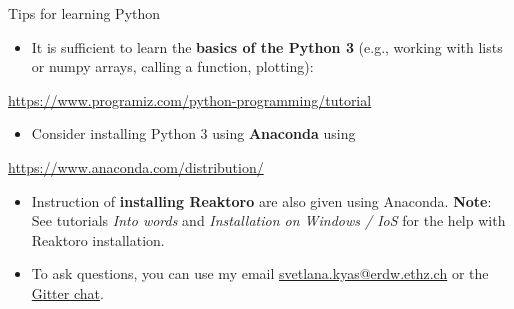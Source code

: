 \begin{frame}{Tips for learning Python}
\begin{itemize}
\item It is sufficient to learn the \alert{\textbf{basics of the Python 3}} (e.g., working with lists or numpy arrays, 
calling a function, plotting):
\end{itemize}
\begin{center}
{\href{https://www.programiz.com/python-programming/tutorial}{https://www.programiz.com/python-programming/tutorial}}{\large\par}
\par\end{center}
\begin{itemize}
\item Consider installing Python 3 using \alert{\textbf{Anaconda}} using
\end{itemize}
\begin{center}
{\href{https://www.anaconda.com/distribution/}{https://www.anaconda.com/distribution/}}{\large\par}
\par\end{center}
\begin{itemize}
\item Instruction of \alert{\textbf{installing Reaktoro}} are also given using Anaconda. 
\textbf{Note}: See tutorials 
\emph{Into words} and \emph{Installation on Windows / IoS} for the help with Reaktoro installation.
%
\item To ask questions, you can use my email \href{svetlana.kyas@erdw.ethz.ch}{svetlana.kyas@erdw.ethz.ch} or the \href{https://gitter.im/geofluids/community}{Gitter chat}.

\end{itemize}
\end{frame}

%
